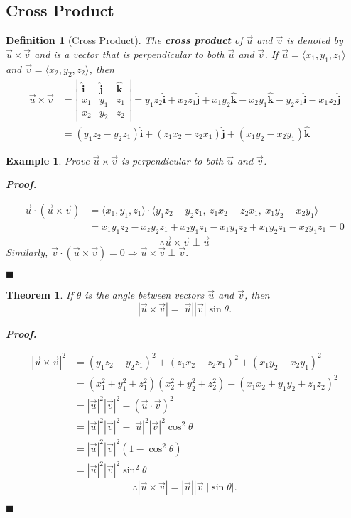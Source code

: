 \documentclass[12pt,a4paper]{article}
\newtheorem{thm}{Theorem}[subsection]
\newtheorem{df}{Definition}[subsection]
\newtheorem{eg}{Example}[subsection]
\newenvironment*{prf}{\par\indent\textbf{\textit{Proof. }}\par}{\par\hfill$\blacksquare$\par}
\def\vecv{\vec{v}}
\def\vecu{\vec{u}}
\def\veci{\hat{\boldsymbol{\textbf{i}}}}
\def\vecj{\hat{\boldsymbol{\textbf{j}}}}
\def\veck{\hat{\boldsymbol{\textbf{k}}}}
\begin{document}
\subsection{Cross Product}
\begin{df}[Cross Product]
	The \textbf{cross product} of $\vecu$ and $\vecv$ is denoted by $\vecu\times\vecv$ and is a vector that is perpendicular to both $\vecu$ and $\vecv$. If $\vecu=\langle x_1,y_1,z_1\rangle$ and $\vecv=\langle x_2,y_2,z_2\rangle$, then 
	\[\begin{aligned}
		\vecu\times\vecv&=\left|\begin{matrix}\veci&\vecj&\veck\\x_1&y_1&z_1\\x_2&y_2&z_2\end{matrix}\right|=y_1z_2\veci+x_2z_1\vecj+x_1y_2\veck-x_2y_1\veck-y_2z_1\veci-x_1z_2\vecj\\
		&=(y_1z_2-y_2z_1)\veci+(z_1x_2-z_2x_1)\vecj+(x_1y_2-x_2y_1)\veck
	\end{aligned}\]
\end{df}
\begin{eg}
	Prove $\vecu\times\vecv$ is perpendicular to both $\vecu$ and $\vecv$.
	\begin{prf}	
		\[\begin{aligned}
			\vecu\cdot(\vecu\times\vecv)&=\langle x_1,y_1,z_1\rangle\cdot\langle y_1z_2-y_2z_1,\ z_1x_2-z_2x_1,\ x_1y_2-x_2y_1\rangle\\
			&=x_1y_1z_2-x_zy_2z_1+x_2y_1z_1-x_1y_1z_2+x_1y_2z_1-x_2y_1z_1=0
		\end{aligned}\]
		\[\therefore \vecu\times\vecv\perp\vecu\]
		Similarly, $\vecv\cdot(\vecu\times\vecv)=0\Longrightarrow\vecu\times\vecv\perp\vecv.$
	\end{prf}
\end{eg}
\begin{thm}
	If $\theta$ is the angle between vectors $\vecu$ and $\vecv$, then \[|\vecu\times\vecv|=|\vecu||\vecv|\sin\theta.\]
	\begin{prf}
		\[\begin{aligned}
			|\vecu\times\vecv|^2&=(y_1z_2-y_2z_1)^2+(z_1x_2-z_2x_1)^2+(x_1y_2-x_2y_1)^2\\
			&=(x_1^2+y_1^2+z_1^2)(x_2^2+y_2^2+z_2^2)-(x_1x_2+y_1y_2+z_1z_2)^2\\
			&=|\vecu|^2|\vecv|^2-(\vecu\cdot\vecv)^2\\
			&=|\vecu|^2|\vecv|^2-|\vecu|^2|\vecv|^2\cos^2\theta\\
			&=|\vecu|^2|\vecv|^2(1-\cos^2\theta)\\
			&=|\vecu|^2|\vecv|^2\sin^2\theta
		\end{aligned}\]
		\[\therefore |\vecu\times\vecv|=|\vecu||\vecv||\sin\theta|.\]
	\end{prf}
\end{thm}
\end{document}
